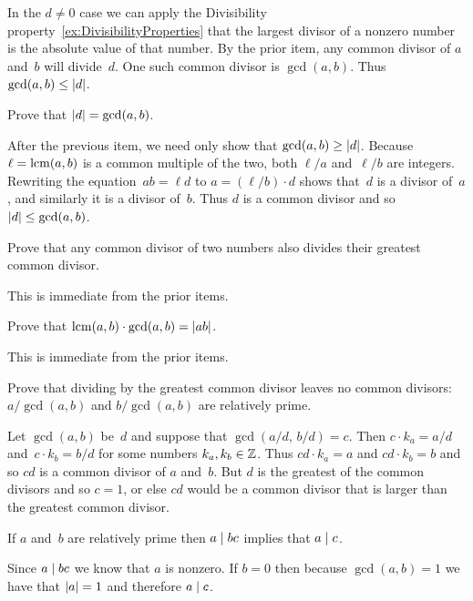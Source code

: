 \documentclass{ibl}  %
\begin{document}
\begin{euclidproof}
\begin{problem}
\begin{exes}
\begin{answer}
  In the $d\neq 0$ case we can apply the 
  Divisibility property~\ref{ex:DivisibilityProperties} that the
  largest divisor of a nonzero number is the absolute value of that number.
  By the prior item, any common divisor of $a$ and~$b$ will divide~$d$.
  One such common divisor is $\gcd(a,b)$.
  Thus $\gcd(a,b)\leq\lvert d\rvert$.  
\end{answer}
\begin{exercise} 
  Prove that $\lvert d\rvert=\gcd(a,b)$. 
\end{exercise}
\begin{answer}
  After the previous item, we need only show that $\gcd(a,b)\geq\lvert d\rvert$. 
  Because $\ell=\operatorname{lcm}(a,b)$ is a common multiple of the two, 
  both $\ell/a$ and~$\ell/b$ are integers. 
  Rewriting the equation~$ab=\ell d$ to 
  $a=(\ell/b)\cdot d$ shows that~$d$ is a divisor of~$a$, and similarly
  it is a divisor of~$b$.
  Thus $d$ is a common divisor and so $\lvert d\rvert\leq \gcd(a,b)$.  
\end{answer}
\begin{exercise} 
  Prove that any common divisor of two numbers also divides their
  greatest common divisor.
\end{exercise}
\begin{answer}
  This is immediate from the prior items.  
\end{answer}
\begin{exercise} 
  Prove that $\operatorname{lcm}(a,b)\cdot\gcd(a,b)=\lvert ab\rvert$. 
\end{exercise}
\begin{answer}
  This is immediate from the prior items.
\end{answer}
\end{exes}  
\end{problem}

\begin{problem}  \label{ex:EuclidsLemma}
\begin{exes} 
\begin{exercise}
  Prove that
  dividing by the greatest common divisor leaves no common divisors:
  $a/\gcd(a,b)$ and $b/\gcd(a,b)$ are relatively prime.
\end{exercise}
\begin{answer}
  Let $\gcd(a,b)$ be~$d$ and suppose that $\gcd(a/d,\,b/d)=c$.
  Then $c\cdot k_a=a/d$ and~$c\cdot k_b=b/d$ for some numbers $k_a, k_b\in\mathbb{Z}$.
  Thus $cd\cdot k_a=a$ and $cd\cdot k_b=b$ and so $cd$ is a common divisor
  of $a$ and~$b$. 
  But $d$ is the greatest of the common divisors and so $c=1$, 
  or else $cd$ would be a common divisor
  that is larger than the greatest common divisor.      
\end{answer}
\begin{exercise}   
  If $a$ and~$b$ are relatively prime then $a\mid bc$ implies that 
  $a\mid c$.
\end{exercise}
\begin{answer}
  Since $a\mid bc$ we know that $a$ is nonzero.
  If $b=0$ then because $\gcd(a,b)=1$ we have that $\lvert a\rvert=1$ 
  and therefore $a\mid c$.


\end{answer}
\end{exes}
\end{problem}
\end{euclidproof}
\end{document}
